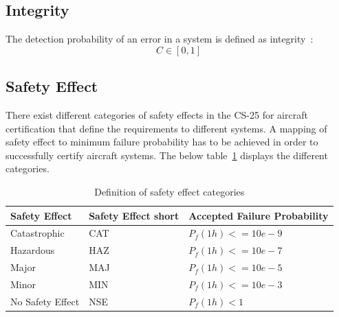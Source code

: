 \subsection{Integrity}\label{subsec:integrity}
The detection probability of an error in a system is defined as integrity~\cite{lfs2}:
\begin{equation}
    \label{eq:integrity}
    C \in [0,1]
\end{equation}
\subsection{Safety Effect}\label{subsec:safety-effect}
There exist different categories of safety effects in the CS-25 for aircraft certification that define the requirements to different systems.
A mapping of safety effect to minimum failure probability has to be achieved in order to successfully certify aircraft systems.
The below table~\ref{tab:safety-effect} displays the different categories.

\begin{table}[!htb]
    \centering
    \begin{tabular}{l|l|l}
        Safety Effect    & Safety Effect short & Accepted Failure Probability \\ \hline
        Catastrophic     & CAT                 & $P_f(1h) <= 10e-9$           \\
        Hazardous        & HAZ                 & $P_f(1h) <= 10e-7$           \\
        Major            & MAJ                 & $P_f(1h) <= 10e-5$           \\
        Minor            & MIN                 & $P_f(1h) <= 10e-3$           \\
        No Safety Effect & NSE                 & $P_f(1h) < 1$
    \end{tabular}
    \caption{Definition of safety effect categories}
    \label{tab:safety-effect}
\end{table}
